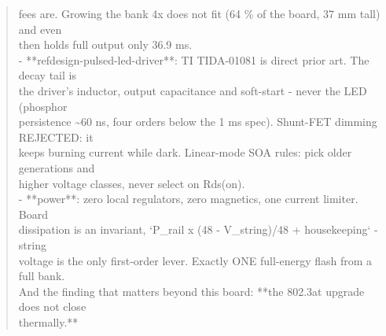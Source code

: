 \documentclass[11pt,a4paper]{article}
\begin{document}
\begin{quote}
  fees are. Growing the bank 4x does not fit (64 \% of the board, 37 mm tall) and even\\
  then holds full output only 36.9 ms.\\
- {*}{*}refdesign-pulsed-led-driver{*}{*}: TI TIDA-01081 is direct prior art. The decay tail is\\
  the driver's inductor, output capacitance and soft-start - never the LED (phosphor\\
  persistence \textasciitilde{}60 ns, four orders below the 1 ms spec). Shunt-FET dimming REJECTED: it\\
  keeps burning current while dark. Linear-mode SOA rules: pick older generations and\\
  higher voltage classes, never select on Rds(on).\\
- {*}{*}power{*}{*}: zero local regulators, zero magnetics, one current limiter. Board\\
  dissipation is an invariant, `P\_rail x (48 - V\_string)/48 + housekeeping` - string\\
  voltage is the only first-order lever. Exactly ONE full-energy flash from a full bank.\\
  And the finding that matters beyond this board: {*}{*}the 802.3at upgrade does not close\\
  thermally.{*}{*}
\end{quote}
\end{document}

